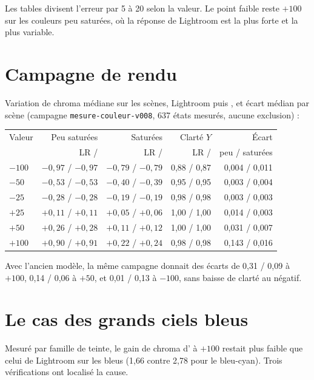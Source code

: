 Les tables divisent l'erreur par 5 à 20 selon la valeur. Le point faible
reste $+100$ sur les couleurs peu saturées, où la réponse de Lightroom est la
plus forte et la plus variable.

\section{Campagne de rendu}
Variation de chroma médiane sur les scènes, Lightroom puis \IPR{}, et écart
médian par scène (campagne \texttt{mesure-couleur-v008}, 637 états mesurés,
aucune exclusion) :

\begin{center}\small
\begin{tabular}{lrrrr}
\toprule
Valeur & Peu saturées & Saturées & Clarté $Y$ & Écart\\
 & LR / \IPR{} & LR / \IPR{} & LR / \IPR{} & peu / saturées\\
\midrule
$-100$ & $-0{,}97$ / $-0{,}97$ & $-0{,}79$ / $-0{,}79$ & 0,88 / 0,87 & 0,004 / 0,011\\
$-50$ & $-0{,}53$ / $-0{,}53$ & $-0{,}40$ / $-0{,}39$ & 0,95 / 0,95 & 0,003 / 0,004\\
$-25$ & $-0{,}28$ / $-0{,}28$ & $-0{,}19$ / $-0{,}19$ & 0,98 / 0,98 & 0,003 / 0,003\\
$+25$ & $+0{,}11$ / $+0{,}11$ & $+0{,}05$ / $+0{,}06$ & 1,00 / 1,00 & 0,014 / 0,003\\
$+50$ & $+0{,}26$ / $+0{,}28$ & $+0{,}11$ / $+0{,}12$ & 1,00 / 1,00 & 0,031 / 0,007\\
$+100$ & $+0{,}90$ / $+0{,}91$ & $+0{,}22$ / $+0{,}24$ & 0,98 / 0,98 & 0,143 / 0,016\\
\bottomrule
\end{tabular}
\end{center}

Avec l'ancien modèle, la même campagne donnait des écarts de 0,31 / 0,09 à
$+100$, 0,14 / 0,06 à $+50$, et 0,01 / 0,13 à $-100$, sans baisse de clarté au
négatif.

\section{Le cas des grands ciels bleus}
Mesuré par famille de teinte, le gain de chroma d'\IPR{} à $+100$ restait plus
faible que celui de Lightroom sur les bleus (1,66 contre 2,78 pour le
bleu-cyan). Trois vérifications ont localisé la cause.

